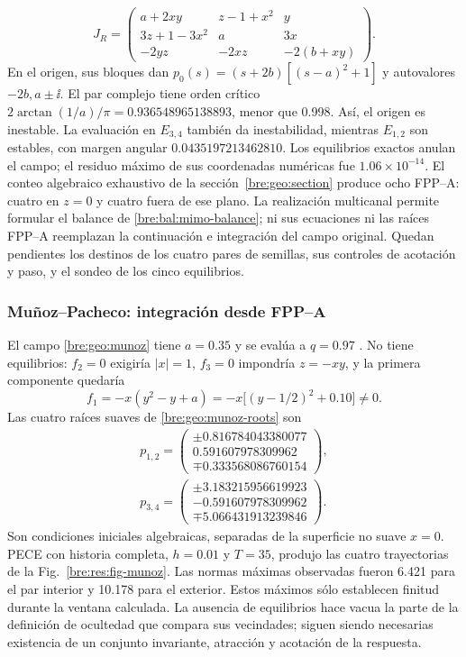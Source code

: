 \begin{equation}
 J_R=\begin{pmatrix}
 a+2xy&z-1+x^2&y\\
 3z+1-3x^2&a&3x\\
 -2yz&-2xz&-2(b+xy)
 \end{pmatrix}.
 \label{bre:res:rf-jacobian}
\end{equation}
En el origen, sus bloques dan
\(p_0(s)=(s+2b)[(s-a)^2+1]\) y autovalores
\(-2b,a\pm\ii\). El par complejo tiene orden crítico
\(2\arctan(1/a)/\pi=0.936548965138893\), menor que 0.998.
Así, el origen es inestable. La evaluación en \(E_{3,4}\) también da
inestabilidad, mientras \(E_{1,2}\) son estables, con margen angular
\(0.0435197213462810\). Los equilibrios exactos anulan el campo; el
residuo máximo de sus coordenadas numéricas fue \(1.06\times10^{-14}\). El conteo algebraico exhaustivo de
la sección~\ref{bre:geo:section} produce ocho FPP--A: cuatro en \(z=0\) y
cuatro fuera de ese plano. La realización multicanal permite formular el
balance de \eqref{bre:bal:mimo-balance}; ni sus ecuaciones ni las raíces
FPP--A reemplazan la continuación e integración del campo original.
Quedan pendientes los destinos de los cuatro pares de semillas, sus
controles de acotación y paso, y el sondeo de los cinco equilibrios.

\subsubsection{Muñoz--Pacheco: integración desde FPP--A}
El campo \eqref{bre:geo:munoz} tiene \(a=0.35\) y se evalúa a
\(q=0.97\) \cite{munoz2018}. No tiene equilibrios: \(f_2=0\) exigiría
\(|x|=1\), \(f_3=0\) impondría \(z=-xy\), y la primera componente
quedaría
\[
 f_1=-x(y^2-y+a)=-x\bigl[(y-1/2)^2+0.10\bigr]\ne0.
\] Las cuatro raíces suaves de
\eqref{bre:geo:munoz-roots} son
\[
 \begin{gathered}
 p_{1,2}=\begin{pmatrix}
 \pm0.816784043380077\\0.591607978309962\\\mp0.333568086760154
 \end{pmatrix},\\
 p_{3,4}=\begin{pmatrix}
 \pm3.183215956619923\\-0.591607978309962\\\mp5.066431913239846
 \end{pmatrix}.
 \end{gathered}
\]
Son condiciones iniciales algebraicas, separadas de la superficie no suave
\(x=0\). PECE con historia completa, \(h=0.01\) y \(T=35\), produjo las
cuatro trayectorias de la Fig.~\ref{bre:res:fig-munoz}. Las normas máximas
observadas fueron 6.421 para el par interior y 10.178 para el exterior.
Estos máximos sólo establecen finitud durante la ventana calculada.
La ausencia de equilibrios hace vacua la parte de la definición de ocultedad
que compara sus vecindades; siguen siendo necesarias existencia de un
conjunto invariante, atracción y acotación de la respuesta.


